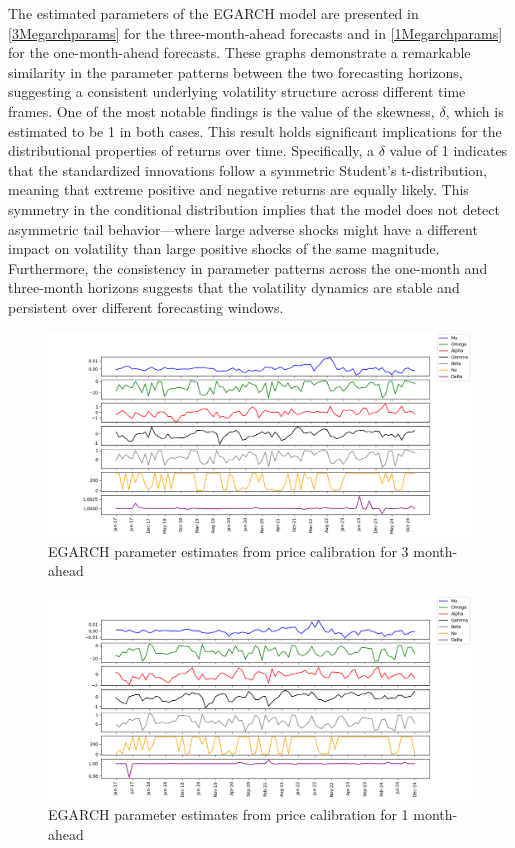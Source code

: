\documentclass[12pt,a4paper]{article}
\newcommand\colorAutoref[1]{{\hypersetup{linkcolor=black}\autoref{#1}}}
\numberwithin{equation}{section}
\begin{document}
The estimated parameters of the EGARCH model are presented in \colorAutoref{3Megarchparams} for the three-month-ahead forecasts and in \colorAutoref{1Megarchparams} for the one-month-ahead forecasts. These graphs demonstrate a remarkable similarity in the parameter patterns between the two forecasting horizons, suggesting a consistent underlying volatility structure across different time frames. One of the most notable findings is the value of the skewness, $\delta$, which is estimated to be 1 in both cases. This result holds significant implications for the distributional properties of returns over time. Specifically, a $\delta$ value of 1 indicates that the standardized innovations follow a symmetric Student’s t-distribution, meaning that extreme positive and negative returns are equally likely. This symmetry in the conditional distribution implies that the model does not detect asymmetric tail behavior—where large adverse shocks might have a different impact on volatility than large positive shocks of the same magnitude. Furthermore, the consistency in parameter patterns across the one-month and three-month horizons suggests that the volatility dynamics are stable and persistent over different forecasting windows.

\begin{figure}[h!] 
\includegraphics[scale=1,width=1\linewidth,height=0.3\textheight]{egarch_params_3m.png}
\caption{EGARCH parameter estimates from price calibration for 3 month-ahead}
\label{3Megarchparams}
\end{figure}

\begin{figure}[h!] 
\includegraphics[scale=1,width=1\linewidth,height=0.3\textheight]{egarch_params_1m.png}
\caption{EGARCH parameter estimates from price calibration for 1 month-ahead}
\label{1Megarchparams}
\end{figure}
\end{document}
